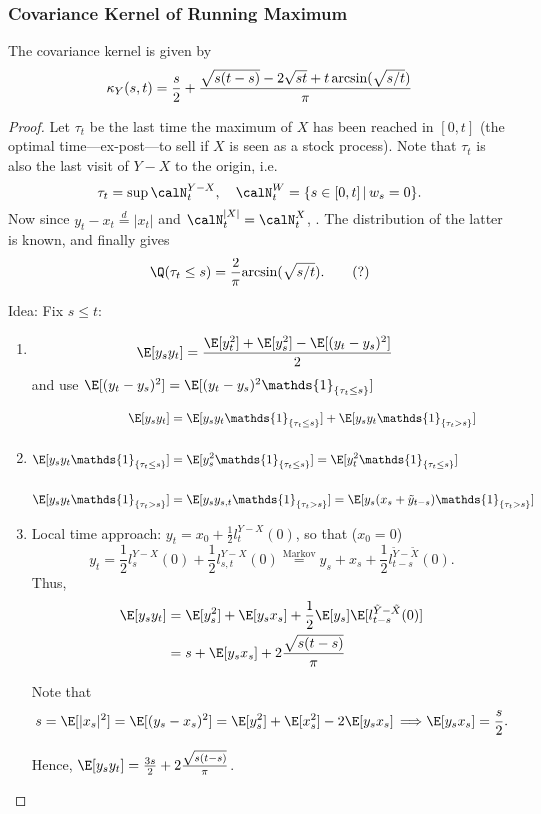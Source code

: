 \newpage
\subsubsection{Covariance Kernel of Running Maximum}

\begin{proposition}
The covariance kernel is given by 
$$\kappa_Y(s,t)=  \frac{s}{2} + \frac{\sqrt{s(t-s)}- 2\sqrt{st} + t \,\textnormal{arcsin}(\sqrt{s/t})}{\pi}$$
\end{proposition}

\begin{proof}
Let $\tau_t$ be  the last time the maximum of $X$ has been reached in $[0,t]$ (the optimal time—ex-post—to sell if $X$ is seen as a stock process).  Note that  $\tau_t$ is also the last visit  of $Y-X$  to the origin, i.e. 
$$\tau_t = \sup \calN_t^{Y-X}, \quad \calN_t^{W} = \{s \in [0,t] \, | \, w_s = 0 \}.$$
Now since $y_t - x_t \overset{d}{=} |x_t|$ and 
$\calN_t^{|X|} = \calN_t^{X}$, . The distribution of the latter is known, and finally gives
$$\Q(\tau_t\le s) = \frac{2}{\pi} \textnormal{arcsin}(\sqrt{s/t}). \qquad (?)$$

Idea: Fix $s\le t$:
\begin{enumerate}
    \item 
\begin{align*}
    \E[y_s y_t] &= \frac{ \E[y_t^2] + \E[y_s^2] - \E[(y_t - y_s)^2] }{2}
\end{align*}
and use $\E[(y_t - y_s)^2]=\E[(y_t - y_s)^2\mathds{1}_{\{\tau_t \le s\}}]$
\item 
\begin{align*}
    \E[y_s y_t] &= \E[y_s y_t\mathds{1}_{\{\tau_t \le s\}}] + \E[y_s y_t\mathds{1}_{\{\tau_t > s\}}]\\\\
   \E[y_s y_t\mathds{1}_{\{\tau_t \le s\}}]  &= \E[y^2_s\mathds{1}_{\{\tau_t \le s\}}] = \E[y^2_t\mathds{1}_{\{\tau_t \le s\}}]\\\\
   \E[y_s y_t\mathds{1}_{\{\tau_t > s\}}] &= \E[y_s y_{s,t}\mathds{1}_{\{\tau_t > s\}}] = \E[y_s (x_s + \tilde{y}_{t-s})\mathds{1}_{\{\tau_t > s\}}]
\end{align*}

\item Local time approach: $y_t = x_0 + \frac{1}{2}l_t^{Y-X}(0)$, so that ($x_0=0$)
$$y_t = \frac{1}{2}l_s^{Y-X}(0) + \frac{1}{2}l_{s,t}^{Y-X}(0) \overset{\text{Markov}}{=} y_s + x_s + \frac{1}{2}l_{t-s}^{\tilde{Y}-\tilde{X}}(0). $$
Thus, 
\begin{align*}
    \E[y_s y_t] &= \E[y_s^2] + \E[y_s x_s] + \frac{1}{2} \E[y_s] \E[l_{t-s}^{\tilde{Y}-\tilde{X}}(0)]\\
    &= s + \E[y_s x_s] + 2\frac{\sqrt{s(t-s)}}{\pi}
\end{align*}

Note that 
$$s = \E[|x_s|^2] = \E[(y_s - x_s)^2] = \E[y_s^2] + \E[x_s^2] - 2 \E[y_s x_s] \, \Longrightarrow \E[y_s x_s] = \frac{s}{2}.$$

Hence, $\E[y_s y_t] = \frac{3s}{2}  + 2\frac{\sqrt{s(t-s)}}{\pi}$.

\end{enumerate}




\end{proof}